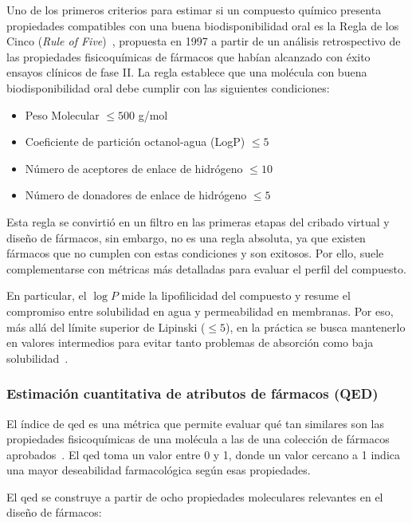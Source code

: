 Uno de los primeros criterios para estimar si un compuesto químico presenta propiedades compatibles con una buena biodisponibilidad oral es la Regla de los Cinco (\textit{Rule of Five})~\cite{Lipinski1997Solubility}, propuesta en 1997 a partir de un análisis retrospectivo de las propiedades fisicoquímicas de fármacos que habían alcanzado con éxito ensayos clínicos de fase II. La regla establece que una molécula con buena biodisponibilidad oral debe cumplir con las siguientes condiciones:

\begin{itemize}
    \item Peso Molecular $\leq 500$ g/mol
    \item Coeficiente de partición octanol-agua (LogP) $\leq 5$
    \item Número de aceptores de enlace de hidrógeno $\leq 10$
    \item Número de donadores de enlace de hidrógeno $\leq 5$
\end{itemize}

Esta regla se convirtió en un filtro en las primeras etapas del cribado virtual y diseño de fármacos, sin embargo, no es una regla absoluta, ya que existen fármacos que no cumplen con estas condiciones y son exitosos. Por ello, suele complementarse con métricas más detalladas para evaluar el perfil del compuesto.

En particular, el $\log P$ mide la lipofilicidad del compuesto y resume el compromiso entre solubilidad en agua y permeabilidad en membranas. Por eso, más allá del límite superior de Lipinski ($\le 5$), en la práctica se busca mantenerlo en valores intermedios para evitar tanto problemas de absorción como baja solubilidad~\cite{Waring2010Lipophilicity}.

\subsubsection{Estimación cuantitativa de atributos de fármacos (QED)}
\label{subsec:qed}

El índice de \gls{qed} es una métrica que permite evaluar qué tan similares son las propiedades fisicoquímicas de una molécula a las de una colección de fármacos aprobados~\cite{Bickerton2012QED}. El \gls{qed} toma un valor entre 0 y 1, donde un valor cercano a 1 indica una mayor deseabilidad farmacológica según esas propiedades.

El \gls{qed} se construye a partir de ocho propiedades moleculares relevantes en el diseño de fármacos: 

